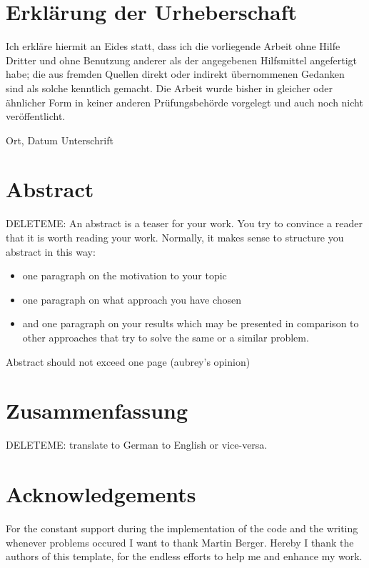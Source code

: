\chapter*{Erkl{\"a}rung der Urheberschaft}
Ich erkläre hiermit an Eides statt, dass ich die vorliegende Arbeit ohne Hilfe Dritter und ohne Benutzung anderer als der angegebenen Hilfsmittel angefertigt habe; die aus fremden Quellen direkt oder indirekt übernommenen Gedanken sind als solche kenntlich gemacht. Die Arbeit wurde bisher in gleicher oder ähnlicher Form in keiner anderen Prüfungsbehörde vorgelegt und auch noch nicht veröffentlicht.


\vspace{4cm}

Ort, Datum \hfill Unterschrift

\newpage
\chapter*{Abstract}
DELETEME: An abstract is a teaser for your work. You try to convince a reader that it is worth reading your work. Normally, it makes sense to structure you abstract in this way: 
\begin{itemize}
\item one paragraph on the motivation to your topic
\item one paragraph on what approach you have chosen
\item and one paragraph on your results which may be presented in comparison to other approaches that try to solve the same or a similar problem.
\end{itemize}
Abstract should not exceed one page (aubrey's opinion)

\newpage
\chapter*{Zusammenfassung}
DELETEME: translate to German to English or vice-versa.

\newpage
\chapter*{Acknowledgements}
For the constant support during the implementation of the code and the writing whenever problems occured I want to thank Martin Berger. Hereby I thank the authors of this template, for the endless efforts to help me and enhance my work.
